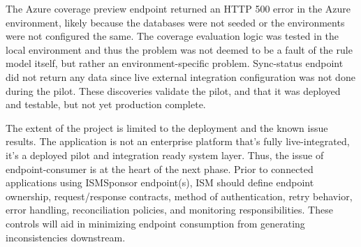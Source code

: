 The Azure coverage preview endpoint returned an HTTP 500 error in the Azure environment, likely because the databases were not seeded or the environments were not configured the same. The coverage evaluation logic was tested in the local environment and thus the problem was not deemed to be a fault of the rule model itself, but rather an environment-specific problem. Sync-status endpoint did not return any data since live external integration configuration was not done during the pilot. These discoveries validate the pilot, and that it was deployed and testable, but not yet production complete.

The extent of the project is limited to the deployment and the known issue results. The application is not an enterprise platform that's fully live-integrated, it's a deployed pilot and integration ready system layer. Thus, the issue of endpoint-consumer is at the heart of the next phase. Prior to connected applications using ISMSponsor endpoint(s), ISM should define endpoint ownership, request/response contracts, method of authentication, retry behavior, error handling, reconciliation policies, and monitoring responsibilities. These controls will aid in minimizing endpoint consumption from generating inconsistencies downstream.



